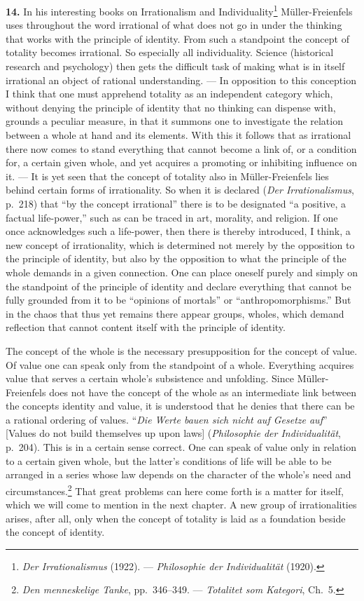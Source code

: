 \documentclass[12pt]{book}
\newcommand{\hnum}[1]{\textbf{#1.}\enspace}
\newcommand{\opage}[1]{\marginnote{\footnotesize\textit{[#1]}}}
\begin{document}
\hnum{14} In his interesting books on Irrationalism and Individuality\footnote{\textit{Der
Irrationalismus} (1922). --- \textit{Philosophie der Individualität} (1920).} Müller-Freienfels uses
throughout the word irrational of what does not go in under the thinking that works with the principle
of identity. From such a standpoint the concept of totality becomes irrational. So especially all
individuality. Science (historical research and psychology) then gets the difficult task of making what
is in itself irrational an object of rational understanding. --- In opposition to this conception I
think that one must apprehend totality as an independent category which, without denying the principle of
identity that no thinking can dispense with, grounds a peculiar measure, in that it summons one to
investigate the relation between a whole at hand and its elements. With this it follows that as irrational
there now comes to stand everything that cannot become a link of, or a condition for, a certain given
whole, and yet acquires a promoting or inhibiting influence on it. --- It is yet seen that the concept of
totality also in Müller-Freienfels lies behind certain forms of irrationality. So when it is declared
(\textit{Der Irrationalismus}, p.\ 218) that ``by the concept irrational'' there is to be designated ``a
positive, a factual life-power,'' such as can be traced in art, morality, and religion. If one once
acknowledges such a life-power, \opage{45}then there is thereby introduced, I think, a new concept of
irrationality, which is determined not merely by the opposition to the principle of identity, but also by
the opposition to what the principle of the whole demands in a given connection. One can place oneself
purely and simply on the standpoint of the principle of identity and declare everything that cannot be
fully grounded from it to be ``opinions of mortals'' or ``anthropomorphisms.'' But in the chaos that thus
yet remains there appear groups, wholes, which demand reflection that cannot content itself with the
principle of identity.

The concept of the whole is the necessary presupposition for the concept of value. Of value one can
speak only from the standpoint of a whole. Everything acquires value that serves a certain whole's
subsistence and unfolding. Since Müller-Freienfels does not have the concept of the whole as an
intermediate link between the concepts identity and value, it is understood that he denies that there can
be a rational ordering of values. ``\textit{Die Werte bauen sich nicht auf Gesetze auf}'' [Values do not
build themselves up upon laws] (\textit{Philosophie der Individualität}, p.\ 204). This is in a certain
sense correct. One can speak of value only in relation to a certain given whole, but the latter's
conditions of life will be able to be arranged in a series whose law depends on the character of the
whole's need and circumstances.\footnote{\textit{Den menneskelige Tanke}, pp.\ 346--349. ---
\textit{Totalitet som Kategori}, Ch.\ 5.} That great problems can here come forth is a matter for itself,
which we will come to mention in the next chapter. A new group of irrationalities arises, after all, only
when the concept of totality is laid as a foundation beside the concept of identity.
\end{document}
